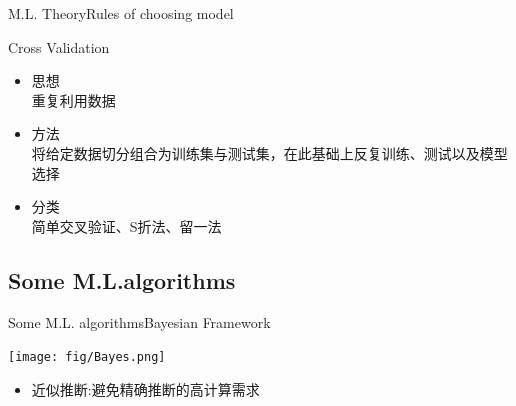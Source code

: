 \documentclass{beamer}
\begin{document}
\begin{frame}{M.L. Theory}{\quad \quad\quad Rules of choosing model}
\begin{block}{Cross Validation}
\begin{itemize}
\item 思想\\重复利用数据
\item 方法\\将给定数据切分组合为训练集与测试集，在此基础上反复训练、测试以及模型选择
\item 分类\\简单交叉验证、S折法、留一法
\end{itemize}
\end{block}
\end{frame}


\subsection{Some M.L.algorithms}

\begin{frame}{Some M.L. algorithms}{\quad \quad \quad Bayesian Framework}

\texttt{[image: fig/Bayes.png]}


   \begin{itemize}
  \item 近似推断:避免精确推断的高计算需求
  \end{itemize}

\end{frame}
\end{document}
